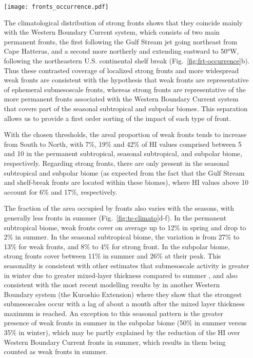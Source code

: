\begin{figure*}
  \texttt{[image: fronts\_occurrence.pdf]}
  \caption{
    occurrence of (a) weak fronts and (b) strong fronts expressed as the percentage of time over the entire time series (2000--2020) that a given pixel is occupied by a front.
  }%
  \label{fig:frt-occurrence}
\end{figure*}

The climatological distribution of strong fronts shows that they coincide mainly with the Western Boundary Current system, which consists of two main permanent fronts, the first following the Gulf Stream jet going northeast from Cape Hatteras, and a second more northerly and extending eastward to 50°W, following the northeastern U.S.
continental shelf break (Fig.~\ref{fig:frt-occurrence}b).
Thus these contrasted coverage of localized strong fronts and more widespread weak fronts are consistent with the hypothesis that weak fronts are representative of ephemeral submesoscale fronts, whereas strong fronts are representative of the more permanent fronts associated with the Western Boundary Current system that covers part of the seasonal subtropical and subpolar biomes.
This separation allows us to provide a first order sorting of the impact of each type of front.

With the chosen thresholds, the areal proportion of weak fronts tends to increase from South to North, with 7\%, 19\% and 42\% of HI values comprised between 5 and 10 in the permanent subtropical, seasonal subtropical, and subpolar biome, respectively.
Regarding strong fronts, there are only present in the seasonal subtropical and subpolar biome (as expected from the fact that the Gulf Stream and shelf-break fronts are located within these biomes), where HI values above 10 account for 6\% and 17\%, respectively.

The fraction of the area occupied by fronts also varies with the seasons, with generally less fronts in summer (Fig.~\ref{fig:ts-climato}d-f).
In the permanent subtropical biome, weak fronts cover on average up to 12\% in spring and drop to 2\% in summer.
In the seasonal subtropical biome, the variation is from 27\% to 13\% for weak fronts, and 8\% to 4\% for strong front.
In the subpolar biome, strong fronts cover between 11\% in summer and 26\% at their peak.
This seasonality is consistent with other estimates that submesoscale activity is greater in winter due to greater mixed-layer thickness compared to summer \citep{callies_2015}, and also consistent with the most recent modelling results by \citet{dong_2020} in another Western Boundary system (the Kuroshio Extension) where they show that the strongest submesoscales occur with a lag of about a month after the mixed layer thickness maximum is reached.
An exception to this seasonal pattern is the greater presence of weak fronts in summer in the subpolar biome (50\% in summer versus 35\% in winter), which may be partly explained by the reduction of the HI over Western Boundary Current fronts in summer, which results in them being counted as weak fronts in summer.

